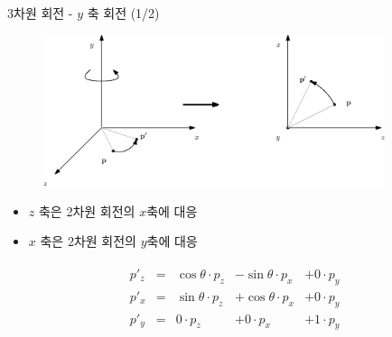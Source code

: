 \begin{frame}{3차원 회전 - $y$ 축 회전 (1/2)}

\begin{figure}
    \includegraphics[width=10cm]{Math_transform/yAxisRotation.eps}
\end{figure}

\begin{itemize}
\item $z$ 축은 2차원 회전의 $x$축에 대응
\item $x$ 축은 2차원 회전의 $y$축에 대응
\end{itemize}

\begin{eqnarray}
\begin{array}{clrrr}
p'_z  & = &\cos \theta \cdot p_z &- \sin \theta \cdot p_x &+ 0 \cdot p_y \\
p'_x  & = &\sin \theta \cdot p_z &+ \cos \theta \cdot p_x &+ 0 \cdot p_y \\
p'_y  & = & 0 \cdot p_z &+ 0 \cdot p_x &+ 1 \cdot p_y
\end{array} \nonumber
\end{eqnarray}


\end{frame}


